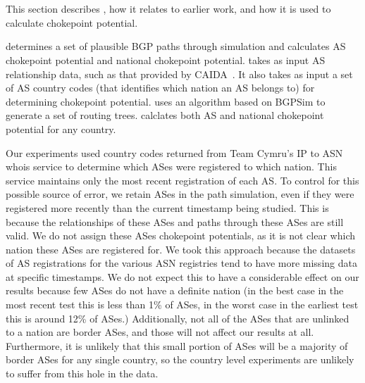 
\section{\toolname}

This section describes \toolname{}, how it relates to earlier work, and how it is used to calculate chokepoint
potential.

\toolname{} determines a set of plausible BGP paths through simulation and calculates AS
chokepoint potential and national chokepoint potential.  \toolname{} takes as input AS relationship data, such as that provided by
CAIDA~\cite{CAIDA}.  It also takes as input a set of AS
country codes (that identifies which nation an AS belongs to) for
determining chokepoint potential.  \toolname{}
uses an algorithm based on BGPSim \cite{quicksand} to
generate a set of routing trees. \toolname{} 
calclates both AS and national chokepoint potential for any country.

Our experiments used country codes returned from Team Cymru's IP to
ASN whois service \cite{cymru} to determine which ASes were registered
to which nation.  This service maintains only the most recent
registration of each AS.  To control for this possible source of
error, we retain ASes in the path simulation, even if they were
registered more recently than the current timestamp being studied. This is because
the relationships of these ASes and paths through these ASes are still valid.
We do not assign these ASes chokepoint potentials, as it is not clear which nation
these ASes are registered for. We took this approach
because the datasets of AS registrations for the various ASN
registries tend to have more missing data at specific timestamps.
We do not expect this to have a considerable effect on our results
because few ASes do not have a definite nation (in the best case in the most recent
test this is less than 1\% of ASes, in the worst case in the earliest test this is around 12\% of ASes.)
Additionally, not all of the ASes that are unlinked to a nation are border ASes, and those will not
affect our results at all. Furthermore, it is unlikely that this small portion of ASes will be a majority
of border ASes for any single country, so the country level experiments are unlikely to suffer from this
hole in the data.

